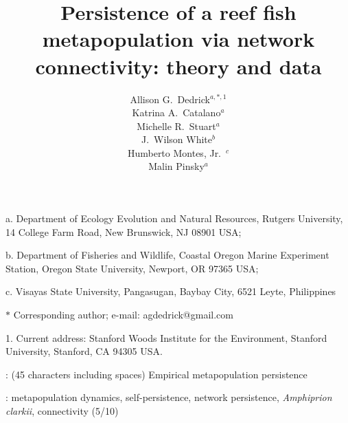 \documentclass[12pt, oneside]{article}   	%
\author{}
\author{Allison G.\ Dedrick$^{a, \ast, 1}$ \\
Katrina A.\ Catalano$^a$ \\
Michelle R.\ Stuart$^a$ \\
J.\ Wilson White$^b$ \\
Humberto Montes, Jr.\ $^c$ \\
Malin Pinsky$^a$}
\title{Persistence of a reef fish metapopulation via network connectivity: theory and data}
\date{}
\begin{document}
\renewcommand{\topfraction}{0.95}
\maketitle{}

\noindent{} a. Department of Ecology Evolution and Natural Resources, Rutgers University, 14 College Farm Road, New Brunswick, NJ 08901 USA;

\noindent{} b. Department of Fisheries and Wildlife, Coastal Oregon Marine Experiment Station, Oregon State University, Newport, OR 97365 USA;

\noindent{} c. Visayas State University, Pangasugan, Baybay City, 6521 Leyte, Philippines

\noindent{} $\ast$ Corresponding author; e-mail: agdedrick@gmail.com

\noindent{} 1. Current address: Stanford Woods Institute for the Environment, Stanford University, Stanford, CA 94305 USA.


: (45 characters including spaces) Empirical metapopulation persistence

: metapopulation dynamics, self-persistence, network persistence, \textit{Amphiprion clarkii}, connectivity (5/10)



\bigskip
\end{document}
